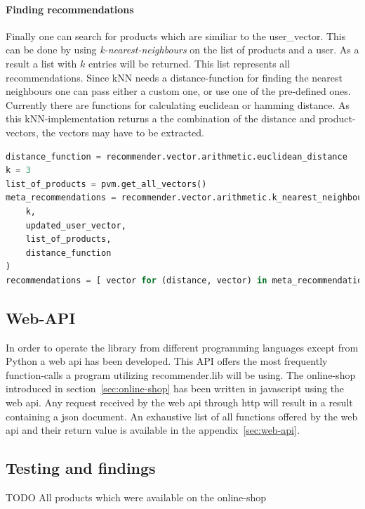 \paragraph{Finding recommendations}
Finally one can search for products which are similiar to the user\_vector.
This can be done by using \textit{k-nearest-neighbours} on the list of products and a user.
As a result a list with $k$ entries will be returned.
This list represents all recommendations.
Since kNN needs a distance-function for finding the nearest neighbours one can pass either a custom one, or use one of the pre-defined ones.
Currently there are functions for calculating euclidean or hamming distance.
As this kNN-implementation returns a the combination of the distance and product-vectors, the vectors may have to be extracted.
\begin{lstlisting}[language=Python,caption={Retrieving recommendations},label={lst:recommenderlib-knn}]
distance_function = recommender.vector.arithmetic.euclidean_distance
k = 3
list_of_products = pvm.get_all_vectors()
meta_recommendations = recommender.vector.arithmetic.k_nearest_neighbours(
    k,
    updated_user_vector,
    list_of_products,
    distance_function
)
recommendations = [ vector for (distance, vector) in meta_recommendations ]
\end{lstlisting}

\subsection{Web-API}
In order to operate the library from different programming languages except from Python a \gls{web api} has been developed.
This API offers the most frequently function-calls a program utilizing recommender.lib will be using.
The online-shop introduced in section~\ref{sec:online-shop} has been written in \gls{javascript} using the \gls{web api}.
Any request received by the web api through \gls{http} will result in a result containing a \gls{json} document.
An exhaustive list of all functions offered by the \gls{web api} and their return value is available in the appendix~\ref{sec:web-api}.


\FloatBarrier

\subsection{Testing and findings}
\label{sec:testing-findings}
{\color{red}TODO}
All products which were available on the online-shop 


